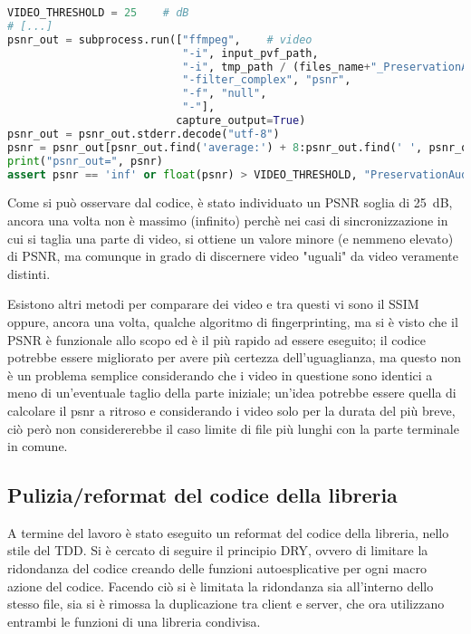 \begin{lstlisting}[language=Python, caption=Test di comparazione di due file audio tramite il psnr]
VIDEO_THRESHOLD = 25    # dB
# [...]
psnr_out = subprocess.run(["ffmpeg",    # video
                           "-i", input_pvf_path,
                           "-i", tmp_path / (files_name+"_PreservationAudioVisualFile_output_video.mov"),
                           "-filter_complex", "psnr",
                           "-f", "null",
                           "-"],
                          capture_output=True)
psnr_out = psnr_out.stderr.decode("utf-8")
psnr = psnr_out[psnr_out.find('average:') + 8:psnr_out.find(' ', psnr_out.find('average:'))]
print("psnr_out=", psnr)
assert psnr == 'inf' or float(psnr) > VIDEO_THRESHOLD, "PreservationAudioVisualFile.mov is not the same as input"
\end{lstlisting}

Come si può osservare dal codice, è stato individuato un \ac{PSNR} soglia di \qty{25}{\dB}, ancora una volta non è massimo (infinito) perchè nei casi di sincronizzazione in cui si taglia una parte di video, si ottiene un valore minore (e nemmeno elevato) di \ac{PSNR}, ma comunque in grado di discernere video "uguali" da video veramente distinti.

Esistono altri metodi per comparare dei video e tra questi vi sono il \ac{SSIM} oppure, ancora una volta, qualche algoritmo di fingerprinting, ma si è visto che il \ac{PSNR} è funzionale allo scopo ed è il più rapido ad essere eseguito; il codice potrebbe essere migliorato per avere più certezza dell'uguaglianza, ma questo non è un problema semplice considerando che i video in questione sono identici a meno di un'eventuale taglio della parte iniziale; un'idea potrebbe essere quella di calcolare il psnr a ritroso e considerando i video solo per la durata del più breve, ciò però non considererebbe il caso limite di file più lunghi con la parte terminale in comune.


\subsection{Pulizia/reformat del codice della libreria} %
A termine del lavoro è stato eseguito un reformat del codice della libreria, nello stile del \ac{TDD}.
Si è cercato di seguire il principio \ac{DRY}, ovvero di limitare la ridondanza del codice creando delle funzioni autoesplicative per ogni macro azione del codice.
Facendo ciò si è limitata la ridondanza sia all'interno dello stesso file, sia si è rimossa la duplicazione tra client e server, che ora utilizzano entrambi le funzioni di una libreria condivisa.

